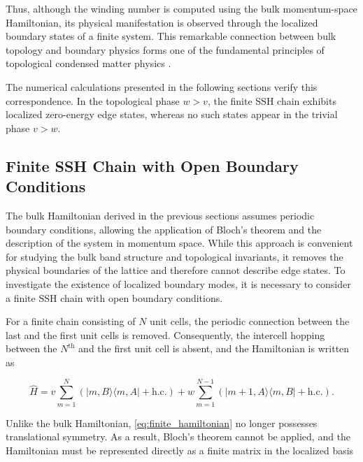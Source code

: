 \documentclass[11pt, a4paper]{article}
\begin{document}
Thus, although the winding number is computed using the bulk momentum-space
Hamiltonian, its physical manifestation is observed through the
localized boundary states of a finite system. This remarkable connection
between bulk topology and boundary physics forms one of the fundamental
principles of topological condensed matter physics .

The numerical calculations presented in the following sections verify
this correspondence. In the topological phase $w>v$, the finite SSH
chain exhibits localized zero-energy edge states, whereas no such states
appear in the trivial phase $v>w$.
















\subsection{Finite SSH Chain with Open Boundary Conditions}

The bulk Hamiltonian derived in the previous sections assumes periodic boundary conditions, allowing the application of Bloch's theorem and the description of the system in momentum space. While this approach is convenient for studying the bulk band structure and topological invariants, it removes the physical boundaries of the lattice and therefore cannot describe edge states. To investigate the existence of localized boundary modes, it is necessary to consider a finite SSH chain with open boundary conditions.

For a finite chain consisting of \(N\) unit cells, the periodic connection between the last and the first unit cells is removed. Consequently, the intercell hopping between the \(N^{\text{th}}\) and the first unit cell is absent, and the Hamiltonian is written as

\begin{equation}
\hat{H}
=
v\sum_{m=1}^{N}
\left(
|m,B\rangle\langle m,A|
+\mathrm{h.c.}
\right)
+
w\sum_{m=1}^{N-1}
\left(
|m+1,A\rangle\langle m,B|
+\mathrm{h.c.}
\right).
\label{eq:finite_hamiltonian}
\end{equation}

Unlike the bulk Hamiltonian, \cref{eq:finite_hamiltonian} no longer possesses translational symmetry. As a result, Bloch's theorem cannot be applied, and the Hamiltonian must be represented directly as a finite matrix in the localized basis
\end{document}
